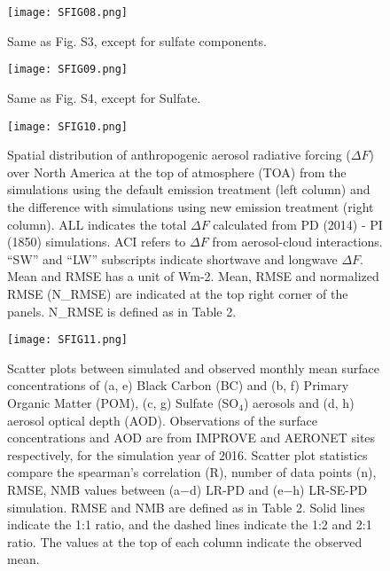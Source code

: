 \documentclass[journal abbreviation, manuscript]{copernicus}
\begin{document}
\clearpage
\begin{figure}[t]
\texttt{[image: SFIG08.png]}
\caption{Same as Fig. S3, except for sulfate components. }
\end{figure}

\clearpage
\begin{figure}[t]
\texttt{[image: SFIG09.png]}
\caption{Same as Fig. S4, except for Sulfate. }
\end{figure}

\clearpage
\begin{figure}[t]
\texttt{[image: SFIG10.png]}
\caption{Spatial distribution of anthropogenic aerosol radiative forcing ($\Delta{F}$) over North America at the top of atmosphere (TOA) from the simulations using the default emission treatment (left column) and the difference with simulations using new emission treatment (right column). ALL indicates the total $\Delta{F}$ calculated from PD (2014) - PI (1850) simulations. ACI refers to $\Delta{F}$ from aerosol-cloud interactions. “SW” and “LW” subscripts indicate shortwave and longwave $\Delta{F}$. Mean and RMSE has a unit of Wm-2. Mean, RMSE and normalized RMSE (N\_RMSE) are indicated at the top right corner of the panels. N\_RMSE is defined as in Table 2.}
\end{figure}

\clearpage
\begin{figure}[t]
\texttt{[image: SFIG11.png]}
\caption{Scatter plots between simulated and observed monthly mean surface concentrations of (a, e) Black Carbon (BC) and (b, f) Primary Organic Matter (POM), (c, g) Sulfate (SO$_4$) aerosols and (d, h) aerosol optical depth (AOD). Observations of the surface concentrations and AOD are from IMPROVE and AERONET sites respectively, for the simulation year of 2016. Scatter plot statistics compare the spearman’s correlation (R), number of data points (n), RMSE, NMB values between (a$-$d) LR-PD and (e$-$h) LR-SE-PD simulation. RMSE and NMB are defined as in Table 2. Solid lines indicate the 1:1 ratio, and the dashed lines indicate the 1:2 and 2:1 ratio. The values at the top of each column indicate the observed mean.}
\end{figure}
\end{document}
